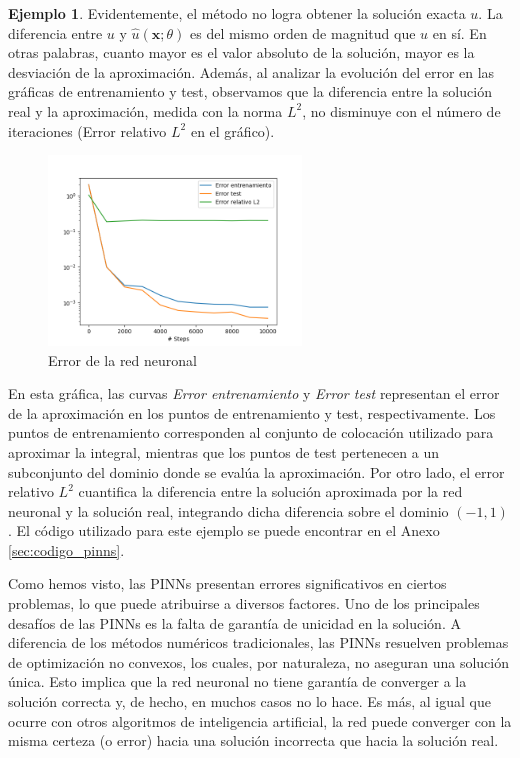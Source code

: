 \documentclass[a4paper,11pt,spanish, twoside, leqno]{tfg-uam}
\theoremstyle{definition}
\newtheorem{exmp}[teor]{Ejemplo}
\begin{document}
\begin{mdframed}
\begin{exmp}
        Evidentemente, el método no logra obtener la solución exacta $ u $. La diferencia entre $ u $ y $ \hat{u}(\mathbf{x};\theta) $ es del mismo orden de magnitud que $ u $ en sí. En otras palabras, cuanto mayor es el valor absoluto de la solución, mayor es la desviación de la aproximación. Además, al analizar la evolución del error en las gráficas de entrenamiento y test, observamos que la diferencia entre la solución real y la aproximación, medida con la norma $ L^2 $, no disminuye con el número de iteraciones (Error relativo $ L^2 $ en el gráfico).
        \begin{figure}[H]
            \centering
            \includegraphics[width=0.6\textwidth]{Figuras/test_train_pinn_error.png}
            \caption{Error de la red neuronal}
        \end{figure}

        En esta gráfica, las curvas \textit{Error entrenamiento} y \textit{Error test} representan el error de la aproximación en los puntos de entrenamiento y test, respectivamente. Los puntos de entrenamiento corresponden al conjunto de colocación utilizado para aproximar la integral, mientras que los puntos de test pertenecen a un subconjunto del dominio donde se evalúa la aproximación. Por otro lado, el error relativo $L^2$ cuantifica la diferencia entre la solución aproximada por la red neuronal y la solución real, integrando dicha diferencia sobre el dominio $(-1,1)$. El código utilizado para este ejemplo se puede encontrar en el Anexo \ref{sec:codigo_pinns}.
    \end{exmp}
\end{mdframed}

Como hemos visto, las PINNs presentan errores significativos en ciertos problemas, lo que puede atribuirse a diversos factores. Uno de los principales desafíos de las PINNs es la falta de garantía de unicidad en la solución. A diferencia de los métodos numéricos tradicionales, las PINNs resuelven problemas de optimización no convexos, los cuales, por naturaleza, no aseguran una solución única. Esto implica que la red neuronal no tiene garantía de converger a la solución correcta y, de hecho, en muchos casos no lo hace. Es más, al igual que ocurre con otros algoritmos de inteligencia artificial, la red puede converger con la misma certeza (o error) hacia una solución incorrecta que hacia la solución real.
\end{document}
